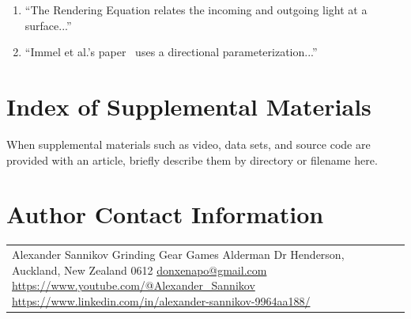 \documentclass{jcgt}
\begin{document}
\begin{enumerate}
\item ``The Rendering Equation \cite{Immel:1986:RMN:15886.15901,Kajiya:1986:RE:15922.15902} relates the incoming and outgoing light at a surface...''
\item ``Immel et al.'s paper~ uses a directional parameterization...''
\end{enumerate}

\small



\section*{Index of Supplemental Materials}
When supplemental materials such as video, data sets, and source code are provided with an article, briefly describe them by directory or filename here.

\section*{Author Contact Information}

\hspace{-2mm}\begin{tabular}{p{}p{}}
Alexander Sannikov \newline
Grinding Gear Games \newline
6 Alderman Dr \newline
Henderson, Auckland, New Zealand 0612 \newline
\href{mailto:donxenapo@gmail.com}{donxenapo@gmail.com} \newline
\href{https://www.youtube.com/@Alexander_Sannikov}{https://www.youtube.com/@Alexander\_Sannikov} \newline
\href{https://www.linkedin.com/in/alexander-sannikov-9964aa188/}{https://www.linkedin.com/in/alexander-sannikov-9964aa188/}

\end{tabular}


\afterdoc
\end{document}
